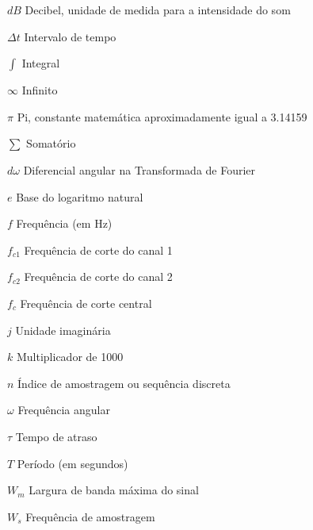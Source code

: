 \begin{simbolos}
  \item[$ \textit{dB} $] Decibel, unidade de medida para a intensidade do som
  \item[$ \Delta t $] Intervalo de tempo
  \item[$ \int $] Integral
  \item[$ \infty $] Infinito
  \item[$ \pi $] Pi, constante matemática aproximadamente igual a 3.14159
  \item[$ \sum $] Somatório
  \item[$ d\omega $] Diferencial angular na Transformada de Fourier
  \item[$ e $] Base do logaritmo natural
  \item[$ f $] Frequência (em Hz)
  \item[$ f_{c1} $] Frequência de corte do canal 1
  \item[$ f_{c2} $] Frequência de corte do canal 2
  \item[$ f_c $] Frequência de corte central
  \item[$ j $] Unidade imaginária
  \item[$ k $] Multiplicador de 1000
  \item[$ n $] Índice de amostragem ou sequência discreta
  \item[$ \omega $] Frequência angular
  \item[$ \tau $] Tempo de atraso
  \item[$ T $] Período (em segundos)
  \item[$ W_m $] Largura de banda máxima do sinal
  \item[$ W_s $] Frequência de amostragem
\end{simbolos}
